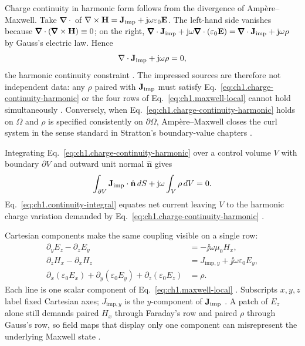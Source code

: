 Charge continuity in harmonic form follows from the divergence of Amp\`ere--Maxwell. Take $\pmb{\nabla}\cdot$ of $\nabla\times\mathbf{H}=\mathbf{J}_{\mathrm{imp}}+\mathrm{j}\omega\varepsilon_0\mathbf{E}$. The left-hand side vanishes because $\pmb{\nabla}\cdot(\pmb{\nabla}\times\mathbf{H})\equiv0$; on the right, $\pmb{\nabla}\cdot\mathbf{J}_{\mathrm{imp}}+\mathrm{j}\omega\pmb{\nabla}\cdot(\varepsilon_0\mathbf{E})=\pmb{\nabla}\cdot\mathbf{J}_{\mathrm{imp}}+\mathrm{j}\omega\rho$ by Gauss's electric law. Hence
\begin{equation}
\label{eq:ch1.charge-continuity-harmonic}
\nabla\cdot\mathbf{J}_{\mathrm{imp}}+\mathrm{j}\omega\rho=0,
\end{equation}
the harmonic continuity constraint \cite{maxwell1873,stratton1941}. The impressed sources are therefore not independent data: any $\rho$ paired with $\mathbf{J}_{\mathrm{imp}}$ must satisfy Eq.~\eqref{eq:ch1.charge-continuity-harmonic} or the four rows of Eq.~\eqref{eq:ch1.maxwell-local} cannot hold simultaneously \cite{hansen1988}. Conversely, when Eq.~\eqref{eq:ch1.charge-continuity-harmonic} holds on $\Omega$ and $\rho$ is specified consistently on $\partial\Omega$, Amp\`ere--Maxwell closes the curl system in the sense standard in Stratton's boundary-value chapters \cite{stratton1941}.

Integrating Eq.~\eqref{eq:ch1.charge-continuity-harmonic} over a control volume $V$ with boundary $\partial V$ and outward unit normal $\hat{\mathbf{n}}$ gives
\begin{equation}
\label{eq:ch1.continuity-integral}
\int_{\partial V}\mathbf{J}_{\mathrm{imp}}\cdot\hat{\mathbf{n}}\,dS
+\mathrm{j}\omega\int_V\rho\,dV=0.
\end{equation}
Eq.~\eqref{eq:ch1.continuity-integral} equates net current leaving $V$ to the harmonic charge variation demanded by Eq.~\eqref{eq:ch1.charge-continuity-harmonic} \cite{maxwell1873,stratton1941}.

Cartesian components make the same coupling visible on a single row:
\begin{equation}
\label{eq:ch1.maxwell-component-example}
\begin{aligned}
\partial_y E_z-\partial_z E_y&=-\jj\omega\mu_0 H_x,\\
\partial_z H_x-\partial_x H_z&=J_{\mathrm{imp},y}+\jj\omega\varepsilon_0 E_y,\\
\partial_x(\varepsilon_0 E_x)+\partial_y(\varepsilon_0 E_y)+\partial_z(\varepsilon_0 E_z)&=\rho.
\end{aligned}
\end{equation}
Each line is one scalar component of Eq.~\eqref{eq:ch1.maxwell-local} \cite{stratton1941}. Subscripts $x,y,z$ label fixed Cartesian axes; $J_{\mathrm{imp},y}$ is the $y$-component of $\mathbf{J}_{\mathrm{imp}}$ \cite{harrington2001}. A patch of $E_z$ alone still demands paired $H_x$ through Faraday's row and paired $\rho$ through Gauss's row, so field maps that display only one component can misrepresent the underlying Maxwell state \cite{maxwell1873}.

